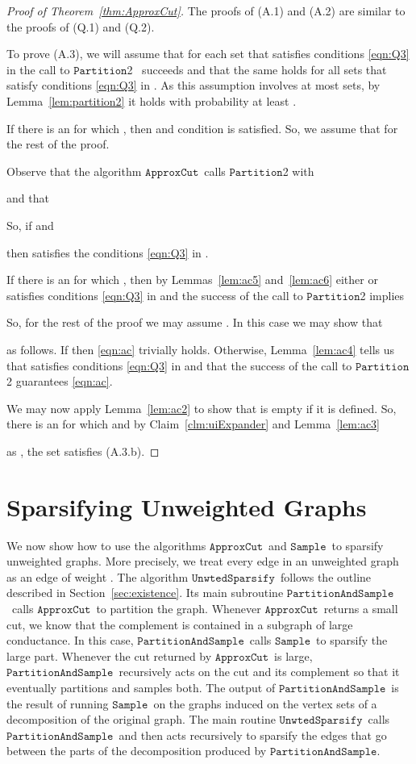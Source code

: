 \documentclass[11pt]{article}
\newcommand{\unwtedsparsify}{\ensuremath{\mathtt{UnwtedSparsify}}}
\newcommand{\sample}{\ensuremath{\mathtt{Sample}}}
\newcommand{\approxcut}{\ensuremath{\mathtt{ApproxCut}}}
\newcommand{\partition}{\ensuremath{\mathtt{Partition}}}
\newcommand{\partsample}{\ensuremath{\mathtt{PartitionAndSample}}}
\begin{document}
\begin{proof}[Proof of Theorem~\ref{thm:ApproxCut}]
The proofs of (A.1) and (A.2) are similar to the proofs of (Q.1) and (Q.2).

To prove (A.3), 
  we will assume that for each set  that satisfies conditions
  \eqref{eqn:Q3} in  the call to \partition2 \ succeeds
 and that the same holds for all sets  that satisfy conditions
  \eqref{eqn:Q3} in .
As this assumption involves at most  sets, by Lemma~\ref{lem:partition2} 
  it holds with probability at least .

If there is an  for which ,
  then 
  and condition  is satisfied.
So, we assume that  for the rest of the proof.

Observe that the algorithm \approxcut \ calls \partition2 with 

and  that 

So, if  and

then  satisfies the conditions \eqref{eqn:Q3} in .

If there is an  for which ,
  then by Lemmas~\ref{lem:ac5} and~\ref{lem:ac6} either 
  or  satisfies conditions
  \eqref{eqn:Q3} in 
 and the success of the call to \partition2 implies


So, for the rest of the proof we may assume
  .
In this case we may show that

as follows.
If  then
  \eqref{eqn:ac} trivially holds.
Otherwise, Lemma~\ref{lem:ac4} tells us that 
  satisfies conditions \eqref{eqn:Q3} in  and
  that the success of the call to \partition2 guarantees \eqref{eqn:ac}.

We may now apply Lemma~\ref{lem:ac2} to show that  is empty if it
  is defined. 
So, there is an  for which  and by Claim~\ref{clm:uiExpander}  and
  Lemma~\ref{lem:ac3} 

as , the set 
  satisfies (A.3.b).
\end{proof}

\section{Sparsifying Unweighted Graphs}\label{sec:unweighted}
We now show how to use the algorithms \approxcut\ and \sample\
  to sparsify unweighted graphs.
More precisely, we treat every edge in an unweighted graph as an
  edge of weight .
The algorithm \unwtedsparsify \ 
  follows the outline described in Section~\ref{sec:existence}.
Its main subroutine \partsample \ calls \approxcut \ to partition the graph.
Whenever \approxcut \ returns a small cut, we know that the complement
  is contained in a subgraph of large conductance.
In this case, \partsample \ calls \sample \ to sparsify the large part.
Whenever the cut returned by \approxcut \ is large, \partsample \
  recursively acts on the cut and its complement so that it eventually
  partitions and samples both.
The output of \partsample \ is 
  the result of running \sample \ on the graphs
  induced on the 
  vertex sets of a decomposition of the original graph.
The main routine \unwtedsparsify \ calls \partsample \ and then
  acts recursively to sparsify the edges that go between the parts
  of the decomposition produced by \partsample .
\end{document}
